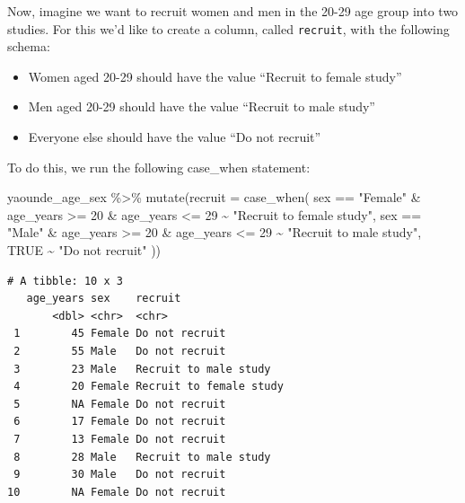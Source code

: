 \documentclass[
  letterpaper,
  DIV=11,
  numbers=noendperiod]{scrreprt}
\newenvironment{Shaded}{\begin{snugshade}}{\end{snugshade}}
\newcommand{\AttributeTok}[1]{\textcolor[rgb]{0.40,0.45,0.13}{#1}}
\newcommand{\ConstantTok}[1]{\textcolor[rgb]{0.56,0.35,0.01}{#1}}
\newcommand{\DecValTok}[1]{\textcolor[rgb]{0.68,0.00,0.00}{#1}}
\newcommand{\FunctionTok}[1]{\textcolor[rgb]{0.28,0.35,0.67}{#1}}
\newcommand{\NormalTok}[1]{\textcolor[rgb]{0.00,0.23,0.31}{#1}}
\newcommand{\SpecialCharTok}[1]{\textcolor[rgb]{0.37,0.37,0.37}{#1}}
\newcommand{\StringTok}[1]{\textcolor[rgb]{0.13,0.47,0.30}{#1}}
\providecommand{\tightlist}{%
  \setlength{\itemsep}{0pt}\setlength{\parskip}{0pt}}\usepackage{longtable,booktabs,array}
\begin{document}
Now, imagine we want to recruit women and men in the 20-29 age group
into two studies. For this we'd like to create a column, called
\texttt{recruit}, with the following schema:

\begin{itemize}
\tightlist
\item
  Women aged 20-29 should have the value ``Recruit to female study''
\item
  Men aged 20-29 should have the value ``Recruit to male study''
\item
  Everyone else should have the value ``Do not recruit''
\end{itemize}

To do this, we run the following case\_when statement:

\begin{Shaded}
\begin{Highlighting}[]
\NormalTok{yaounde\_age\_sex }\SpecialCharTok{\%\textgreater{}\%}
  \FunctionTok{mutate}\NormalTok{(}\AttributeTok{recruit =} \FunctionTok{case\_when}\NormalTok{(}
\NormalTok{    sex }\SpecialCharTok{==} \StringTok{"Female"} \SpecialCharTok{\&}\NormalTok{ age\_years }\SpecialCharTok{\textgreater{}=} \DecValTok{20} \SpecialCharTok{\&}\NormalTok{ age\_years }\SpecialCharTok{\textless{}=} \DecValTok{29} \SpecialCharTok{\textasciitilde{}} \StringTok{"Recruit to female study"}\NormalTok{,}
\NormalTok{    sex }\SpecialCharTok{==} \StringTok{"Male"} \SpecialCharTok{\&}\NormalTok{ age\_years }\SpecialCharTok{\textgreater{}=} \DecValTok{20} \SpecialCharTok{\&}\NormalTok{ age\_years }\SpecialCharTok{\textless{}=} \DecValTok{29} \SpecialCharTok{\textasciitilde{}} \StringTok{"Recruit to male study"}\NormalTok{,}
    \ConstantTok{TRUE} \SpecialCharTok{\textasciitilde{}} \StringTok{"Do not recruit"}
\NormalTok{  ))}
\end{Highlighting}
\end{Shaded}

\begin{verbatim}
# A tibble: 10 x 3
   age_years sex    recruit                
       <dbl> <chr>  <chr>                  
 1        45 Female Do not recruit         
 2        55 Male   Do not recruit         
 3        23 Male   Recruit to male study  
 4        20 Female Recruit to female study
 5        NA Female Do not recruit         
 6        17 Female Do not recruit         
 7        13 Female Do not recruit         
 8        28 Male   Recruit to male study  
 9        30 Male   Do not recruit         
10        NA Female Do not recruit         
\end{verbatim}
\end{document}

